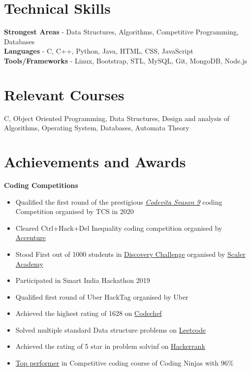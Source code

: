 \documentclass[margin, centered]{res}
\begin{document}
\begin{resume}
\section{Technical \hspace{2mm} Skills}
\textbf{Strongest Areas} - Data Structures, Algorithms, Competitive Programming, Databases \\
\textbf{Languages} - C, C++, Python, Java, HTML, CSS, JavaScript  \\
\textbf{Tools/Frameworks} - Linux, Bootstrap, STL, MySQL, Git, MongoDB, Node.js


\section{Relevant \hspace{2mm} Courses}
C, Object Oriented Programming, Data Structures, Design and analysis of Algorithms, Operating System, Databases, Automata Theory


\section{Achievements and Awards}
\textbf{Coding Competitions}
\begin{itemize}[leftmargin=*]
 \item Qualified the first round of the prestigious  \href{https://drive.google.com/file/d/16OY0sqsJXUs4BXPSdkCaoF_2f4SIdxKI/view?usp=sharing}{\emph{Codevita Season 9}} coding Competition organised by TCS in 2020
 \item Cleared Ctrl+Hack+Del Inequality coding competition organised by \href{https://www.accenture.com/in-en}{Accenture}
 \item Stood First out of 1000 students in  \href{https://drive.google.com/file/d/1IO5cW3NQkcZCm8p65HSRLOaKHfI16ZbS/view?usp=sharing}{Discovery Challenge} organised by \href{https://www.scaler.com/}{Scaler Academy}
 \item Participated in Smart India Hackathon 2019
 \item Qualified first round of Uber HackTag organised by Uber
 \item Achieved the highest rating of 1628 on \href{https://www.codechef.com/users/tannu_kumari}{Codechef}
 \item Solved multiple standard Data structure problems on \href{https://leetcode.com/tannu_kumari/}{Leetcode}
 \item Achieved the rating of 5 star in problem solvinf on \href {https://www.hackerrank.com/tannuchoudhary10}{Hackerrank}
 \item \href{https://drive.google.com/file/d/1kJhDdn9UZug1x1Rb8qo6iefYvjDPisYn/view?usp=sharing}{Top performer} in Competitive coding course of Coding Ninjas with 96\%
 

\end{itemize}
\end{resume}
\end{document}
